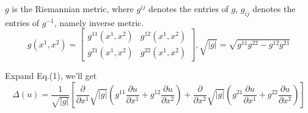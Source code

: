 \documentclass{article}
\theoremstyle{definition}
\theoremstyle{plain}
\begin{document}
$g$ is the Riemannian metric, where $g^{ij}$ denotes the entries of $g$, $g_{ij}$ denotes the entries of $g^{-1}$, namely inverse metric.
\begin{equation}
    g(x^1,x^2)
    =
    \left[\begin{array}{cc}
        g^{11}(x^1,x^2) & g^{12}(x^1,x^2) \\
        g^{21}(x^1,x^2) & g^{22}(x^1,x^2) 
    \end{array}\right], \sqrt{|g|}=\sqrt{g^{11}g^{22}-g^{12}g^{21}}
\end{equation}

Expand Eq.(1), we'll get
\begin{equation}
    \Delta(u)=
    \frac{1}{\sqrt{|g|}}\left[\frac{\partial}{\partial x^1}\sqrt{|g|}\left(g^{11}\frac{\partial u}{\partial x^1}+g^{12}\frac{\partial u}{\partial x^2}\right)+\frac{\partial}{\partial x^2}\sqrt{|g|}\left(g^{21}\frac{\partial u}{\partial x^1}+g^{22}\frac{\partial u}{\partial x^2}\right)\right]
\end{equation}
\end{document}
